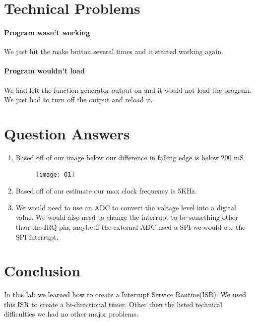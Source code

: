 \documentclass{article}
\begin{document}
	\section*{Technical Problems}
	\paragraph*{Program wasn't working} We just hit the make button several times and it started working again.
	\paragraph*{Program wouldn't load} We had left the function generator output on and it would not load the program. We just had to turn off the output and reload it.
	\section*{Question Answers}
	\begin{enumerate}
		\item Based off of our image below our difference in falling edge is below 200 mS.
		\begin{figure}[H]
			\centering
			\texttt{[image: Q1]}
		\end{figure}
		\item Based off of our estimate our max clock frequency is 5KHz.
		\item We would need to use an ADC to convert the voltage level into a digital value. We would also need to change the interrupt to be something other than the IRQ pin, maybe if the external ADC used a SPI we would use the SPI interrupt.
	\end{enumerate}
	\section*{Conclusion}
	\par
	In this lab we learned how to create a Interrupt Service Routine(ISR). We used this ISR to create a bi-directional timer. Other then the listed technical difficulties we had no other major problems.
\end{document}

